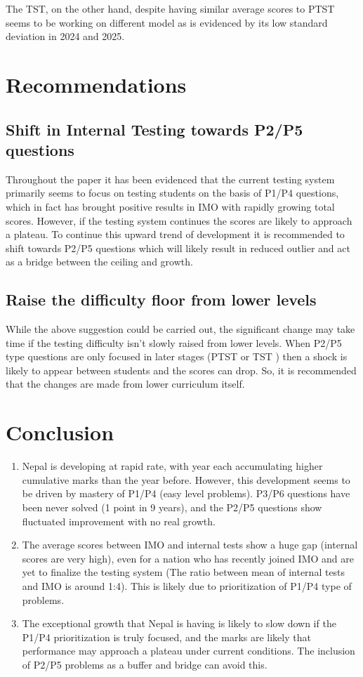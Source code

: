 \documentclass{report}
\begin{document}
The TST, on the other hand, despite having similar average scores to PTST seems to be working on different model as is evidenced by its low standard deviation in 2024 and 2025.

\section{Recommendations}

\subsection{Shift in Internal Testing towards P2/P5 questions}
Throughout the paper it has been evidenced that the current testing system primarily seems to focus on testing students on the basis of P1/P4 questions, which in fact has brought positive results in IMO with rapidly growing total scores. However, if the testing system continues the scores are likely to approach a plateau. To continue this upward trend of development it is recommended to shift towards P2/P5 questions which will likely result in reduced outlier and act as a bridge between the ceiling and growth. 

\subsection{Raise the difficulty floor from lower levels}
While the above suggestion could be carried out, the significant change may take time if the testing difficulty isn't slowly raised from lower levels. When P2/P5 type questions are only focused in later stages (PTST or TST ) then a shock is likely to appear between students and the scores can drop. So, it is recommended that the changes are made from lower curriculum itself. 
\newpage
\section{Conclusion}
\begin{enumerate}
    \item Nepal is developing at rapid rate, with year each accumulating higher cumulative marks than the year before. However, this development seems to be driven by mastery of P1/P4 (easy level problems). P3/P6 questions have been never solved (1 point in 9 years), and the P2/P5 questions show fluctuated improvement with no real growth. 
    \item The average scores between IMO and internal tests show a huge gap (internal scores are very high), even for a nation who has recently joined IMO and are yet to finalize the testing system (The ratio between mean of internal tests and IMO is around 1:4). This is likely due to prioritization of P1/P4 type of problems.
    \item The exceptional growth that Nepal is having is likely to slow down if the P1/P4 prioritization is truly focused, and the marks are likely that performance may approach a plateau under current conditions. The inclusion of P2/P5 problems as a buffer and bridge can avoid this.
\end{enumerate}
\end{document}
